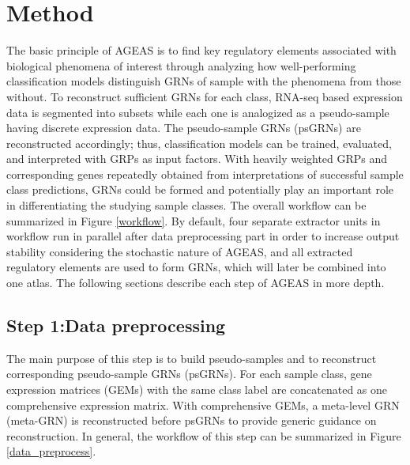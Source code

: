 \documentclass[fleqn,10pt]{wlscirep}
\begin{document}
\section*{Method}
  \label{method}
  The basic principle of AGEAS is to find key regulatory elements associated with biological phenomena of interest through analyzing how well-performing classification models distinguish GRNs of sample with the phenomena from those without.
  To reconstruct sufficient GRNs for each class, RNA-seq based expression data is segmented into subsets while each one is analogized as a pseudo-sample having discrete expression data.
  The pseudo-sample GRNs (psGRNs) are reconstructed accordingly; thus, classification models can be trained, evaluated, and interpreted with GRPs as input factors.
  With heavily weighted GRPs and corresponding genes repeatedly obtained from interpretations of successful sample class predictions, GRNs could be formed and potentially play an important role in differentiating the studying sample classes.
  The overall workflow can be summarized in Figure \ref{workflow}.
  By default, four separate extractor units in workflow run in parallel after data preprocessing part in order to increase output stability considering the stochastic nature of AGEAS, and all extracted regulatory elements are used to form GRNs, which will later be combined into one atlas.
  The following sections describe each step of AGEAS in more depth.


  \subsection*{Step 1:Data preprocessing}
    \label{step1}
    The main purpose of this step is to build pseudo-samples and to reconstruct corresponding pseudo-sample GRNs (psGRNs).
    For each sample class, gene expression matrices (GEMs) with the same class label are concatenated as one comprehensive expression matrix.
    With comprehensive GEMs, a meta-level GRN (meta-GRN) is reconstructed before psGRNs to provide generic guidance on reconstruction.
    In general, the workflow of this step can be summarized in Figure \ref{data_preprocess}.
\end{document}
